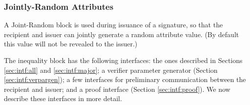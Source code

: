     \subsubsection{Jointly-Random Attributes}
     \notimplemented

    A Joint-Random block is used during issuance of a signature, so
    that the recipient and issuer can jointly generate a random attribute value.
    (By default this value will not be revealed to the issuer.)

    The inequality block has the following interfaces:
    the ones described in Sections \ref{sec:intf:all} and \ref{sec:intf:major};
    a verifier parameter generator (Section \ref{sec:intf:verpargen});
    a few interfaces for preliminary communication between the recipient and issuer;
    and a proof interface (Section \ref{sec:intf:proof}).
      We now describe these interfaces in more detail.

